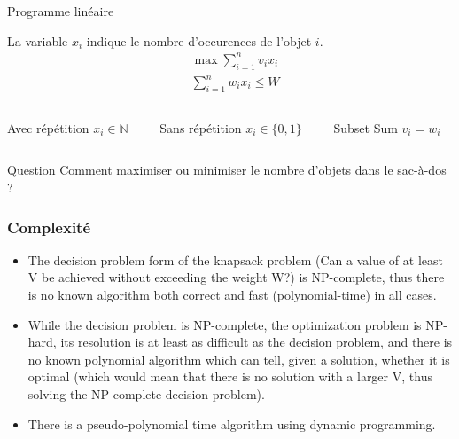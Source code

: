 \documentclass{beamer}
\begin{document}
\begin{frame}{Programme linéaire}
  \begin{alertblock}{  La variable $x_i$ indique le nombre d'occurences de l'objet $i$.}
  \begin{align*}
    & \max \sum_{i=1}^n v_i x_i \\
    & \sum_{i=1}^n w_i x_i  \leq  W
  \end{align*}
  \end{alertblock}

  \begin{columns}[t]
    \begin{column}{0.3\textwidth}
      \begin{block}{Avec répétition}
        $x_i \in \mathbb{N}$
      \end{block}
    \end{column}
    \begin{column}{0.3\textwidth}
      \begin{block}{Sans répétition}
        $x_i \in \{0,1\}$
      \end{block}
    \end{column}
    \begin{column}{0.3\textwidth}
      \begin{block}{Subset Sum}
        $v_i = w_i$
      \end{block}
    \end{column}
  \end{columns}

  \begin{exampleblock}{Question}
    Comment maximiser ou minimiser le nombre d'objets dans le sac-à-dos ?
  \end{exampleblock}
\end{frame}


\begin{frame}
  \frametitle{Complexité}

  \begin{itemize}
  \item   The decision problem form of the knapsack problem (Can a value of at least V be achieved without exceeding the weight W?) is NP-complete, thus there is no known algorithm both correct and fast (polynomial-time) in all cases.
  \item While the decision problem is NP-complete, the optimization problem is NP-hard, its resolution is at least as difficult as the decision problem, and there is no known polynomial algorithm which can tell, given a solution, whether it is optimal (which would mean that there is no solution with a larger V, thus solving the NP-complete decision problem).
  \item There is a pseudo-polynomial time algorithm using dynamic programming.
  \end{itemize}


\end{frame}
\end{document}
